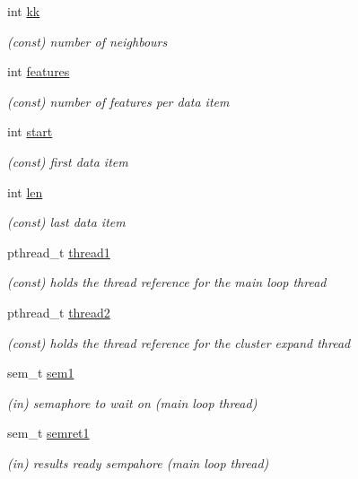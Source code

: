 \begin{DoxyCompactItemize}
int \mbox{\hyperlink{structdbscan__pt_a07b73afdc253e16524b7eae0f6ec26b4}{kk}}
\begin{DoxyCompactList}\small\item\em (const) number of neighbours \end{DoxyCompactList}\item 
int \mbox{\hyperlink{structdbscan__pt_a22b641c18fac3731d31e9ded8c0c93eb}{features}}
\begin{DoxyCompactList}\small\item\em (const) number of features per data item \end{DoxyCompactList}\item 
int \mbox{\hyperlink{structdbscan__pt_ab35e524b61208589ee28bbf4a79341ae}{start}}
\begin{DoxyCompactList}\small\item\em (const) first data item \end{DoxyCompactList}\item 
int \mbox{\hyperlink{structdbscan__pt_a75fa5f27f7e41e5472087a847388daaf}{len}}
\begin{DoxyCompactList}\small\item\em (const) last data item \end{DoxyCompactList}\item 
pthread\+\_\+t \mbox{\hyperlink{structdbscan__pt_a2535cf2a4899d30b008b26dfa92bd44c}{thread1}}
\begin{DoxyCompactList}\small\item\em (const) holds the thread reference for the main loop thread \end{DoxyCompactList}\item 
pthread\+\_\+t \mbox{\hyperlink{structdbscan__pt_a4c0ec8c2730f9a56a4b186692de79c47}{thread2}}
\begin{DoxyCompactList}\small\item\em (const) holds the thread reference for the cluster expand thread \end{DoxyCompactList}\item 
sem\+\_\+t \mbox{\hyperlink{structdbscan__pt_a716ce695e04d99f1e045fb9de1fb70f0}{sem1}}
\begin{DoxyCompactList}\small\item\em (in) semaphore to wait on (main loop thread) \end{DoxyCompactList}\item 
sem\+\_\+t \mbox{\hyperlink{structdbscan__pt_af4a16a1139b3ee7e1dfcec9d415a8855}{semret1}}
\begin{DoxyCompactList}\small\item\em (in) results ready sempahore (main loop thread) \end{DoxyCompactList}\item 

\end{DoxyCompactItemize}
